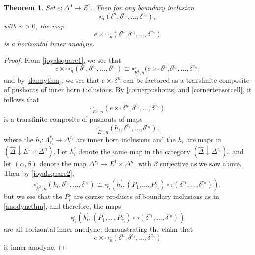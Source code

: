 \documentclass[leqno]{article}
\numberwithin{equation}{subsection}
\theoremstyle{plain}   %
\newtheorem{thm}[equation]{Theorem}
\theoremstyle{remark}
\theoremstyle{plain}
\newcommand{\overcat}[2]{{\left(#1\downarrow #2\right)}}
\newcommand{\psh}[1]{\ensuremath{\widehat{#1}}}
\begin{document}
\begin{thm}\label{joyalisothm}
	Set \(e:\Delta^0\to E^1\). Then for any boundary inclusion 
	\[\square_n^\lrcorner(\delta^n,\delta^{c_1},\dots,\delta^{c_n}),\]
	with \(n>0\), the map 
	\[e \times^\lrcorner \square_n^\lrcorner(\delta^n,\delta^{c_1},\dots,\delta^{c_n})\]
	is a horizontal inner anodyne.
\end{thm}
\begin{proof}
	From \ref{joyalsquare1}, we see that 
	\[e \times^\lrcorner \square^\lrcorner_n(\delta^n,\delta^{c_1},\dots,\delta^{c_n}) \cong \square^\lrcorner_{E^1,n}(e\times^\lrcorner \delta^n, \delta^{c_1},\dots,\delta^{c_n},\]
	and by \ref{dannythm}, we see that \(e\times^\lrcorner \delta^n\) can be factored as a transfinite composite of pushouts of inner horn inclusions.  By \ref{cornerpushouts} and \ref{cornertensorcell}, it follows that 
	\[\square^\lrcorner_{E^1,n}(e\times^\lrcorner \delta^n, \delta^{c_1},\dots,\delta^{c_n})\]
	is a transfinite composite of pushouts of maps
	\[\square^\lrcorner_{E^1,n}(h_i, \delta^{c_1},\dots,\delta^{c_n}),\]
	where the \(h_i:\Lambda^{r_i}_{\ell_i}\to \Delta^{r_i}\) are inner horn inclusions and the \(h_i\) are maps in \(\overcat{\psh{\Delta}}{E^1 \times \Delta^n}\).  Let \(h^\prime_i\) denote the same map in the category \(\overcat{\psh{\Delta}}{\Delta^{r_i}},\) and let \((\alpha,\beta)\) denote the map \(\Delta^{r_i} \to E^1 \times \Delta^n\), with \(\beta\) surjective as we saw above.  Then by \ref{joyalsquare2}, 
	\[\square_{E^1,n}^\lrcorner(h_i, \delta^{c_1},\dots,\delta^{c_n}) \cong \square^\lrcorner_{r_i}(h^\prime_i,(P_1^\lrcorner,\dots, P_{r_i}^\lrcorner) \circ \tau(\delta^{c_1},\dots,\delta^{c_n})),\]
	but we see that the \(P^\lrcorner_i\) are corner products of boundary inclusions as in \ref{anodynethm}, and therefore, the maps
	\[\square^\lrcorner_{r_i}(h^\prime_i,(P_1^\lrcorner,\dots, P_{r_i}^\lrcorner) \circ \tau(\delta^{c_1},\dots,\delta^{c_n}))\] 
	are all horizontal inner anodyne, demonstrating the claim that
	\[e \times^\lrcorner \square_n^\lrcorner(\delta^n,\delta^{c_1},\dots,\delta^{c_n})\]
	is inner anodyne.
\end{proof}
\end{document}
